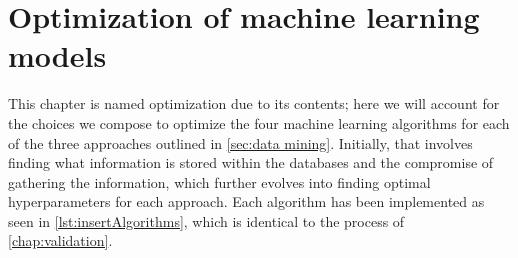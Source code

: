 \chapter{Optimization of machine learning models}

This chapter is named optimization due to its contents; here we will account for the choices we compose to optimize the four machine learning algorithms for each of the three approaches outlined in \autoref{sec:data mining}. Initially, that involves finding what information is stored within the databases and the compromise of gathering the information, which further evolves into finding optimal hyperparameters for each approach. Each algorithm has been implemented as seen in \ref{lst:insertAlgorithms}, which is identical to the process of \autoref{chap:validation}.

\begin{comment}
\section{Time of extraction and featurization}

The initial thought behind

\begin{table}[!ht]
\centering
\caption{}
\label{tab:timing-extraction}
\noindent\makebox[\textwidth]{
\begin{tabular}{M{3.0cm} M{4.0cm} M{4.0cm}}
  \hline
  \hline
  Database & Extraction period & Estimated time usage  \\
  \hline
  Materials Project & December $2020$ & $5$ min \\
  Citrine Informatics & December $2020$ & $2$ min  \\
  OQMD & December $2020$ & $3$ min \\
  AFLOW & January $2020$ - February $2021$ & $17$ days \\
  AFLOW-ML & January $2020$ - February $2021$ & $16$ days \\
  JARVIS-DFT & January $2020$ & $5$ min \\
  \hline
  \hline
\end{tabular}
}
\end{table}

\end{comment}
